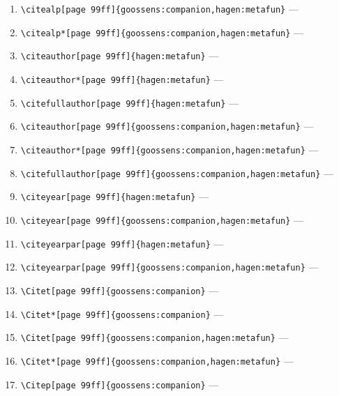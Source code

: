 \documentclass[12pt]{article}
\begin{document}
\begin{enumerate}
\verb|\citealp*[page 99ff]{hagen:metafun}| ---
\citealp*[page 99ff]{hagen:metafun}
\item
\verb|\citealp[page 99ff]{goossens:companion,hagen:metafun}| ---
\citealp[page 99ff]{goossens:companion,hagen:metafun}
\item
\verb|\citealp*[page 99ff]{goossens:companion,hagen:metafun}| ---
\citealp*[page 99ff]{goossens:companion,hagen:metafun}
\item
\verb|\citeauthor[page 99ff]{hagen:metafun}| ---
\citeauthor[page 99ff]{hagen:metafun}
\item
\verb|\citeauthor*[page 99ff]{hagen:metafun}| ---
\citeauthor*[page 99ff]{hagen:metafun}
\item
\verb|\citefullauthor[page 99ff]{hagen:metafun}| ---
\item
\verb|\citeauthor[page 99ff]{goossens:companion,hagen:metafun}| ---
\citeauthor[page 99ff]{goossens:companion,hagen:metafun}
\item
\verb|\citeauthor*[page 99ff]{goossens:companion,hagen:metafun}| ---
\citeauthor*[page 99ff]{goossens:companion,hagen:metafun}
\item
\verb|\citefullauthor[page 99ff]{goossens:companion,hagen:metafun}| ---
\item
\verb|\citeyear[page 99ff]{hagen:metafun}| ---
\citeyear[page 99ff]{hagen:metafun}
\item
\verb|\citeyear[page 99ff]{goossens:companion,hagen:metafun}| ---
\citeyear[page 99ff]{goossens:companion,hagen:metafun}
\item
\verb|\citeyearpar[page 99ff]{hagen:metafun}| ---
\citeyearpar[page 99ff]{hagen:metafun}
\item
\verb|\citeyearpar[page 99ff]{goossens:companion,hagen:metafun}| ---
\citeyearpar[page 99ff]{goossens:companion,hagen:metafun}
\item
\verb|\Citet[page 99ff]{goossens:companion}| ---
\item
\verb|\Citet*[page 99ff]{goossens:companion}| ---
\item
\verb|\Citet[page 99ff]{goossens:companion,hagen:metafun}| ---
\item
\verb|\Citet*[page 99ff]{goossens:companion,hagen:metafun}| ---
\item
\verb|\Citep[page 99ff]{goossens:companion}| ---

\end{enumerate}
\end{document}

